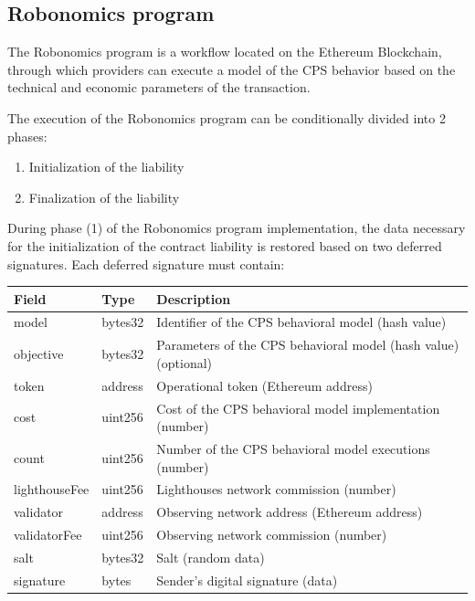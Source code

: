 \documentclass{article}
\begin{document}
\subsection{Robonomics program}

The Robonomics program is a workflow located on the Ethereum Blockchain, through which providers can execute a model of the CPS behavior based on the technical and economic parameters of the transaction.

The execution of the Robonomics program can be conditionally divided into 2 phases:

\begin{enumerate}
	\item Initialization of the liability
	\item Finalization of the liability
\end{enumerate}

During phase (1) of the Robonomics program implementation, the data necessary for the initialization of the contract liability is restored based on two deferred signatures. Each deferred signature must contain:
\newline
\newline

\begin{tabular}{ |l |l |l }
 \textbf{Field} & \textbf{Type} & \textbf{Description} \\ 
 \hline
 model & bytes32 & Identifier of the CPS behavioral model (hash value) \\  
 objective & bytes32 & Parameters of the CPS behavioral model (hash value) (optional) \\
 token & address & Operational token (Ethereum address) \\
 cost & uint256 & Cost of the CPS behavioral model implementation (number) \\
 count & uint256 & Number of the CPS behavioral model executions (number) \\
 lighthouseFee & uint256 & Lighthouses network commission (number) \\
 validator & address & Observing network address (Ethereum address) \\
 validatorFee & uint256 & Observing network commission (number) \\
 salt & bytes32 & Salt (random data) \\
 signature & bytes & Sender's digital signature (data) \\
\end{tabular}
\end{document}
